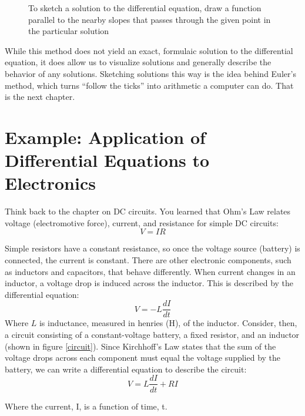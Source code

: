 \begin{figure}[H]
    \caption{To sketch a solution to the differential equation, draw a function 
    parallel to the nearby slopes that passes through the given point in the 
    particular solution}
    \label{slopefield5}
\end{figure}

While this method does not yield an exact, formulaic solution to the 
differential equation, it does allow us to visualize solutions and generally 
describe the behavior of any solutions. Sketching solutions this way is the idea behind
Euler's method, which turns ``follow the ticks'' into arithmetic a computer can
do. That is the next chapter. 

\section{Example: Application of Differential Equations to Electronics}
Think back to the chapter on DC circuits. You learned that Ohm's Law relates 
voltage (electromotive force), current, and resistance for simple DC circuits:
$$V = IR$$

Simple resistors have a constant resistance, so once the voltage source 
(battery) is connected, the current is constant. There are other electronic 
components, such as inductors and capacitors, that behave differently. When 
current changes in an inductor, a voltage drop is induced across the inductor. 
This is described by the differential equation:
$$V = -L\frac{dI}{dt}$$
Where $L$ is inductance, measured in henries (H), of the inductor. Consider, 
then, a circuit consisting of a constant-voltage battery, a fixed resistor, 
and an inductor (shown in figure \ref{circuit}). Since Kirchhoff's Law states 
that the sum of the voltage drops across each component must equal the voltage 
supplied by the battery, we can write a differential equation to describe the 
circuit:
$$V = L\frac{dI}{dt} + RI$$

Where the current, I, is a function of time, t. 

